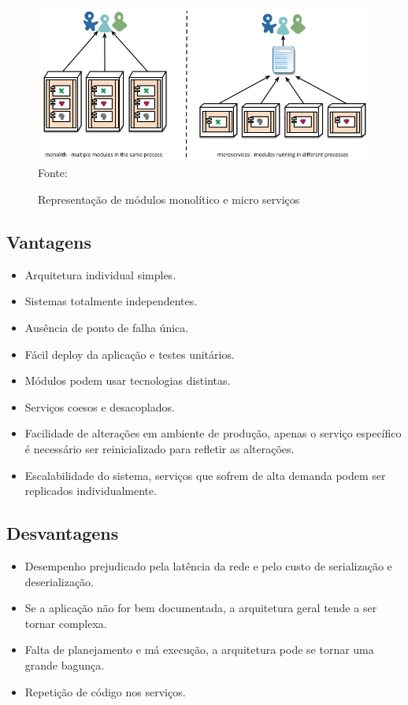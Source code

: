 \begin{figure}[!htpb]
	\centering
	\caption{Representação de módulos monolítico e micro serviços}
	\includegraphics[width=15cm]{images/micro-deployment.png}\\
	Fonte: \cite{microservices2014}
 	\label{f_c2_app_monolitica_vs_microservices}
\end{figure}

\subsection*{Vantagens}
\begin{itemize}
	\item Arquitetura individual simples.
	\item Sistemas totalmente independentes.
	\item Ausência de ponto de falha única.
	\item Fácil deploy da aplicação e testes unitários.
	\item Módulos podem usar tecnologias distintas.
	\item Serviços coesos e desacoplados.
	\item Facilidade de alterações em ambiente de produção, apenas o serviço específico é necessário ser reinicializado para refletir as alterações.
	\item Escalabilidade do sistema, serviços que sofrem de alta demanda podem ser replicados individualmente.
\end{itemize}

\subsection*{Desvantagens}
\begin{itemize}
	\item Desempenho prejudicado pela latência da rede e pelo custo de serialização e deserialização.
	\item Se a aplicação não for bem documentada, a arquitetura geral tende a ser tornar complexa.
	\item Falta de planejamento e má execução, a arquitetura pode se tornar uma grande bagunça.
	\item Repetição de código nos serviços.
\end{itemize}

